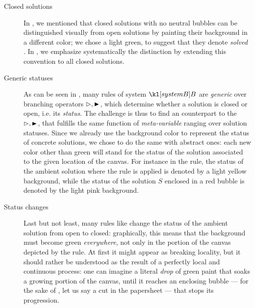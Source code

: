 \begin{description}
  \item[Closed solutions] In , we mentioned that closed
solutions with no neutral bubbles can be distinguished visually from open
solutions by painting their background in a different color; we chose a light
green, to suggest that they denote \emph{solved} . In
, we emphasize systematically the distinction by extending
this convention to all closed solutions.
  \item[Generic statuses] As can be seen in , many rules of
system $\sysB$ are \emph{generic} over branching operators $\J, \JB$, which
determine whether a solution is closed or open, i.e. its \emph{status}. The
challenge is thus to find an  counterpart to the  $\J, \JB$, that
fulfills the same function of \emph{meta-variable} ranging over solution
statuses. Since we already use the background color to represent the status of
concrete solutions, we chose to do the same with abstract ones: each new color
other than green will stand for the status of the solution associated to the
given location of the canvas. For instance in the 
rule, the status of the ambient solution where the rule is applied is denoted by
a light yellow background, while the status of the solution $S$ enclosed in a
red bubble is denoted by the light pink background.
  \item[Status changes] Last but not least, many rules like  change
the status of the ambient solution from open to closed: graphically, this means
that the background must become green \emph{everywhere}, not only in the portion
of the canvas depicted by the rule. At first it might appear as breaking
locality, but it should rather be understood as the result of a perfectly local
and continuous process: one can imagine a literal \emph{drop} of green paint
that soaks a growing portion of the canvas, until it reaches an enclosing bubble
--- for the sake of , let us say a cut in the papersheet --- that
stops its progression.
\end{description}

